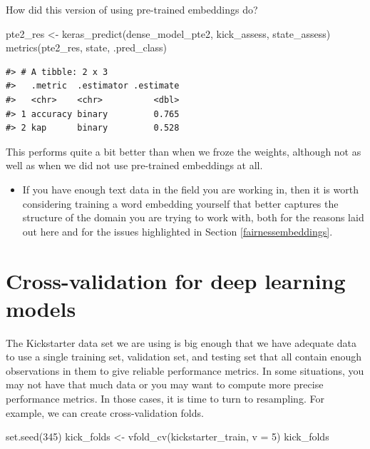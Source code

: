 \documentclass[
]{krantz}
\makeatletter
\newenvironment{Shaded}{\begin{snugshade}}{\end{snugshade}}
\newcommand{\AttributeTok}[1]{\textcolor[rgb]{0.77,0.63,0.00}{#1}}
\newcommand{\DecValTok}[1]{\textcolor[rgb]{0.00,0.00,0.81}{#1}}
\newcommand{\FunctionTok}[1]{\textcolor[rgb]{0.00,0.00,0.00}{#1}}
\newcommand{\NormalTok}[1]{#1}
\newcommand{\OtherTok}[1]{\textcolor[rgb]{0.56,0.35,0.01}{#1}}
\newenvironment{kframe}{%
\medskip{}
\setlength{\fboxsep}{.8em}
 \def\at@end@of@kframe{}%
 \ifinner\ifhmode%
  \def\at@end@of@kframe{\end{minipage}}%
  \begin{minipage}{\columnwidth}%
 \fi\fi%
 \def\FrameCommand##1{\hskip\@totalleftmargin \hskip-\fboxsep
 \colorbox{shadecolor}{##1}\hskip-\fboxsep
     \hskip-\linewidth \hskip-\@totalleftmargin \hskip\columnwidth}%
 \MakeFramed {\advance\hsize-\width
   \@totalleftmargin\z@ \linewidth\hsize
   \@setminipage}}%
 {\par\unskip\endMakeFramed%
 \at@end@of@kframe}
\renewenvironment{Shaded}{\begin{kframe}}{\end{kframe}}
\newenvironment{rmdblock}[1]
  {\begin{shaded*}
  \begin{itemize}[left = -1cm, labelsep = 1cm]
  \renewcommand{\labelitemi}{
    \raisebox{-.7\height}[0pt][0pt]{
      {\setkeys{Gin}{width=3em,keepaspectratio}\texttt{[image: images/\#1]}}
    }
  }
 
  \item
  }
  {
  \end{itemize}
  \end{shaded*}
  }
\newenvironment{rmdnote}
  {\begin{rmdblock}{note}}
  {\end{rmdblock}}
\makeatother
\begin{document}
How did this version of using pre-trained embeddings do?

\begin{Shaded}
\begin{Highlighting}[]
\NormalTok{pte2\_res }\OtherTok{\textless{}{-}} \FunctionTok{keras\_predict}\NormalTok{(dense\_model\_pte2, kick\_assess, state\_assess)}
\FunctionTok{metrics}\NormalTok{(pte2\_res, state, .pred\_class)}
\end{Highlighting}
\end{Shaded}

\begin{verbatim}
#> # A tibble: 2 x 3
#>   .metric  .estimator .estimate
#>   <chr>    <chr>          <dbl>
#> 1 accuracy binary         0.765
#> 2 kap      binary         0.528
\end{verbatim}

This performs quite a bit better than when we froze the weights, although not as well as when we did not use pre-trained embeddings at all.

\begin{rmdnote}
If you have enough text data in the field you are working in, then it is worth considering training a word embedding yourself that better captures the structure of the domain you are trying to work with, both for the reasons laid out here and for the issues highlighted in Section \ref{fairnessembeddings}.
\end{rmdnote}

\hypertarget{dnncross}{%
\section{Cross-validation for deep learning models}\label{dnncross}}

The Kickstarter data set we are using is big enough that we have adequate data to use a single training set, validation set, and testing set that all contain enough observations in them to give reliable performance metrics. In some situations, you may not have that much data or you may want to compute more precise performance metrics. In those cases, it is time to turn to resampling. For example, we can create cross-validation folds.

\begin{Shaded}
\begin{Highlighting}[]
\FunctionTok{set.seed}\NormalTok{(}\DecValTok{345}\NormalTok{)}
\NormalTok{kick\_folds }\OtherTok{\textless{}{-}} \FunctionTok{vfold\_cv}\NormalTok{(kickstarter\_train, }\AttributeTok{v =} \DecValTok{5}\NormalTok{)}
\NormalTok{kick\_folds}
\end{Highlighting}
\end{Shaded}
\end{document}
